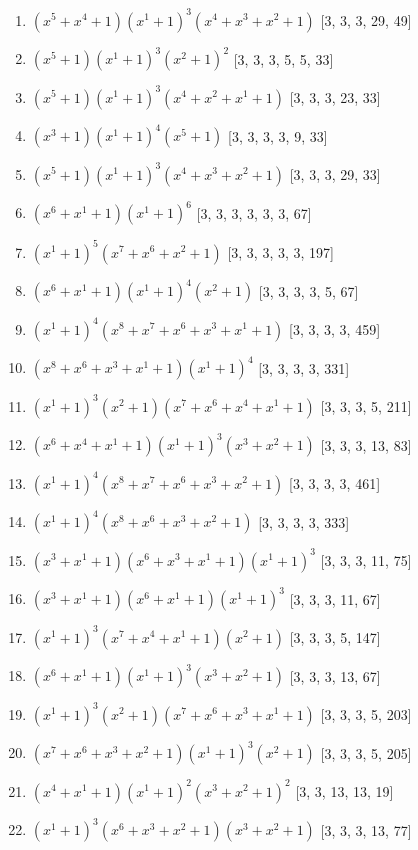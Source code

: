 \documentclass[10pt,twocolumn]{article}
\begin{document}
\begin{enumerate}
\item $(x^{5} + x^{4} + 1)(x^{1} + 1)^{3}(x^{4} + x^{3} + x^{2} + 1)$  [3, 3, 3, 29, 49]
\item $(x^{5} + 1)(x^{1} + 1)^{3}(x^{2} + 1)^{2}$  [3, 3, 3, 5, 5, 33]
\item $(x^{5} + 1)(x^{1} + 1)^{3}(x^{4} + x^{2} + x^{1} + 1)$  [3, 3, 3, 23, 33]
\item $(x^{3} + 1)(x^{1} + 1)^{4}(x^{5} + 1)$  [3, 3, 3, 3, 9, 33]
\item $(x^{5} + 1)(x^{1} + 1)^{3}(x^{4} + x^{3} + x^{2} + 1)$  [3, 3, 3, 29, 33]
\item $(x^{6} + x^{1} + 1)(x^{1} + 1)^{6}$  [3, 3, 3, 3, 3, 3, 67]
\item $(x^{1} + 1)^{5}(x^{7} + x^{6} + x^{2} + 1)$  [3, 3, 3, 3, 3, 197]
\item $(x^{6} + x^{1} + 1)(x^{1} + 1)^{4}(x^{2} + 1)$  [3, 3, 3, 3, 5, 67]
\item $(x^{1} + 1)^{4}(x^{8} + x^{7} + x^{6} + x^{3} + x^{1} + 1)$  [3, 3, 3, 3, 459]
\item $(x^{8} + x^{6} + x^{3} + x^{1} + 1)(x^{1} + 1)^{4}$  [3, 3, 3, 3, 331]
\item $(x^{1} + 1)^{3}(x^{2} + 1)(x^{7} + x^{6} + x^{4} + x^{1} + 1)$  [3, 3, 3, 5, 211]
\item $(x^{6} + x^{4} + x^{1} + 1)(x^{1} + 1)^{3}(x^{3} + x^{2} + 1)$  [3, 3, 3, 13, 83]
\item $(x^{1} + 1)^{4}(x^{8} + x^{7} + x^{6} + x^{3} + x^{2} + 1)$  [3, 3, 3, 3, 461]
\item $(x^{1} + 1)^{4}(x^{8} + x^{6} + x^{3} + x^{2} + 1)$  [3, 3, 3, 3, 333]
\item $(x^{3} + x^{1} + 1)(x^{6} + x^{3} + x^{1} + 1)(x^{1} + 1)^{3}$  [3, 3, 3, 11, 75]
\item $(x^{3} + x^{1} + 1)(x^{6} + x^{1} + 1)(x^{1} + 1)^{3}$  [3, 3, 3, 11, 67]
\item $(x^{1} + 1)^{3}(x^{7} + x^{4} + x^{1} + 1)(x^{2} + 1)$  [3, 3, 3, 5, 147]
\item $(x^{6} + x^{1} + 1)(x^{1} + 1)^{3}(x^{3} + x^{2} + 1)$  [3, 3, 3, 13, 67]
\item $(x^{1} + 1)^{3}(x^{2} + 1)(x^{7} + x^{6} + x^{3} + x^{1} + 1)$  [3, 3, 3, 5, 203]
\item $(x^{7} + x^{6} + x^{3} + x^{2} + 1)(x^{1} + 1)^{3}(x^{2} + 1)$  [3, 3, 3, 5, 205]
\item $(x^{4} + x^{1} + 1)(x^{1} + 1)^{2}(x^{3} + x^{2} + 1)^{2}$  [3, 3, 13, 13, 19]
\item $(x^{1} + 1)^{3}(x^{6} + x^{3} + x^{2} + 1)(x^{3} + x^{2} + 1)$  [3, 3, 3, 13, 77]

\end{enumerate}
\end{document}
